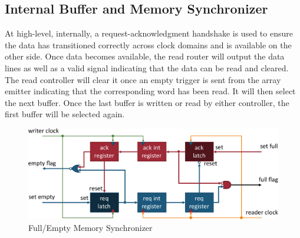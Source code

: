     \subsection{Internal Buffer and Memory Synchronizer}
        \label{Sec:MemorySync}
        At high-level, internally, a request-acknowledgment handshake is used to ensure the data has transitioned correctly across clock domains and is available on the other side. Once data becomes available, the read router will output the data lines as well as a valid signal indicating that the data can be read and cleared. The read controller will clear it once an empty trigger is sent from the array emitter indicating that the corresponding word has been read. It will then select the next buffer. Once the last buffer is written or read by either controller, the first buffer will be selected again.

        \begin{figure}
            \centering
            \includegraphics[width=1.0\textwidth]{fig/full_empty_circuit.pdf}
            \caption{Full/Empty Memory Synchronizer}
            \label{fig:full_empty_circuit}
        \end{figure}

